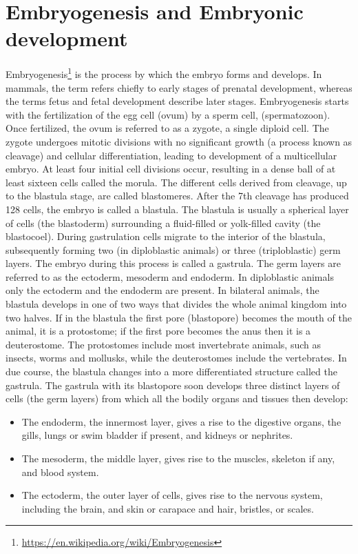 \documentclass[]{book}
\providecommand{\tightlist}{%
  \setlength{\itemsep}{0pt}\setlength{\parskip}{0pt}}
\let\rmarkdownfootnote\footnote%
\def\footnote{\protect\rmarkdownfootnote}
\renewcommand{\href}[2]{#2\footnote{\url{#1}}}
\theoremstyle{definition}
\theoremstyle{definition}
\theoremstyle{definition}
\theoremstyle{remark}
\begin{document}
\section{Embryogenesis and Embryonic
development}\label{embryogenesis-and-embryonic-development}

\href{https://en.wikipedia.org/wiki/Embryogenesis}{Embryogenesis} is the
process by which the embryo forms and develops. In mammals, the term
refers chiefly to early stages of prenatal development, whereas the
terms fetus and fetal development describe later stages. Embryogenesis
starts with the fertilization of the egg cell (ovum) by a sperm cell,
(spermatozoon). Once fertilized, the ovum is referred to as a zygote, a
single diploid cell. The zygote undergoes mitotic divisions with no
significant growth (a process known as cleavage) and cellular
differentiation, leading to development of a multicellular embryo. At
least four initial cell divisions occur, resulting in a dense ball of at
least sixteen cells called the morula. The different cells derived from
cleavage, up to the blastula stage, are called blastomeres. After the
7th cleavage has produced 128 cells, the embryo is called a blastula.
The blastula is usually a spherical layer of cells (the blastoderm)
surrounding a fluid-filled or yolk-filled cavity (the blastocoel).
During gastrulation cells migrate to the interior of the blastula,
subsequently forming two (in diploblastic animals) or three
(triploblastic) germ layers. The embryo during this process is called a
gastrula. The germ layers are referred to as the ectoderm, mesoderm and
endoderm. In diploblastic animals only the ectoderm and the endoderm are
present. In bilateral animals, the blastula develops in one of two ways
that divides the whole animal kingdom into two halves. If in the
blastula the first pore (blastopore) becomes the mouth of the animal, it
is a protostome; if the first pore becomes the anus then it is a
deuterostome. The protostomes include most invertebrate animals, such as
insects, worms and mollusks, while the deuterostomes include the
vertebrates. In due course, the blastula changes into a more
differentiated structure called the gastrula. The gastrula with its
blastopore soon develops three distinct layers of cells (the germ
layers) from which all the bodily organs and tissues then develop:

\begin{itemize}
\tightlist
\item
  The endoderm, the innermost layer, gives a rise to the digestive
  organs, the gills, lungs or swim bladder if present, and kidneys or
  nephrites.
\item
  The mesoderm, the middle layer, gives rise to the muscles, skeleton if
  any, and blood system.
\item
  The ectoderm, the outer layer of cells, gives rise to the nervous
  system, including the brain, and skin or carapace and hair, bristles,
  or scales.
\end{itemize}
\end{document}
